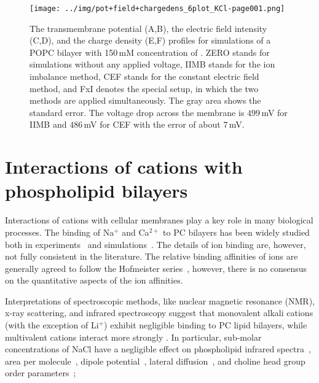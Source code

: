 \begin{figure}[btp]
\begin{center}
\texttt{[image: ../img/pot+field+chargedens\_6plot\_KCl-page001.png]}
 \caption{The transmembrane potential (A,B), the electric field intensity (C,D), and the charge density (E,F) profiles for simulations of a POPC bilayer with 150\,mM concentration of . 
ZERO stands for simulations without any applied voltage,
IIMB stands for the ion imbalance method,
CEF  stands for the constant electric field method,
and FxI denotes the special setup, in which the two methods are applied simultaneously. 
The gray area shows the standard error. 
The voltage drop across the membrane is $499\,$mV for IIMB and $486\,$mV for CEF with the error of about $7\,$mV.  
}
\label{fig:potentialKCl}
\end{center}
\end{figure}






\section{Interactions of cations with phospholipid bilayers}

Interactions of cations with cellular membranes play a key role in many biological processes. 
The binding of Na$^+$ and Ca$^{2+}$ to PC bilayers has been widely studied both in
experiments~\citep{akutsu81,altenbach84,seelig90,cevc90,tocanne90,binder02,pabst07,uhrikova08}
and simulations~\citep{magarkar2017, bockmann03,bockmann04,berkowitz12,melcrova16,javanainen17, catte16, nmrlipids_proj4}.
The details of ion binding are, however, not fully consistent in the literature.
The relative binding affinities of ions are generally agreed to
follow the Hofmeister series~\citep{eisenberg79,cevc90,tocanne90,binder02,celma07,leontidis09,vacha09a,klasczyk10,harb13}, 
however,
there is no consensus on the quantitative aspects of the ion affinities. 

Interpretations of spectroscopic methods, like nuclear magnetic resonance (NMR), 
x-ray scattering, and infrared spectroscopy suggest that monovalent alkali cations (with the exception of Li$^+$) 
exhibit negligible binding to PC lipid bilayers, 
while multivalent cations interact more strongly 
\citep{cevc90,tocanne90, hauser76,hauser78,herbette84,altenbach84,uhrikova08}.
In particular, sub-molar concentrations of NaCl have a negligible effect on
phospholipid infrared spectra~\citep{binder02},
area per molecule~\citep{pabst07},
dipole potential~\citep{clarke99},
lateral diffusion~\citep{filippov09},
and choline head group order parameters~\citep{akutsu81};


